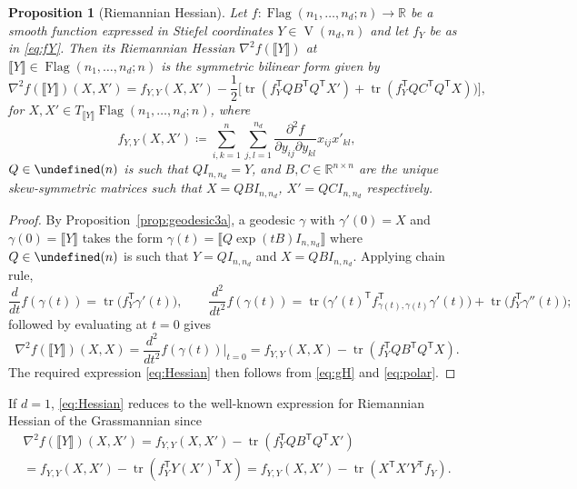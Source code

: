 \documentclass[11pt,reqno]{amsart}%
\newtheorem{proposition}[theorem]{Proposition}
\theoremstyle{definition}
\theoremstyle{remark}
\newcommand{\tp}{{\scriptscriptstyle\mathsf{T}}}
\newcommand{\lb}{\llbracket}
\newcommand{\rb}{\rrbracket}
\let\O\undefined
\DeclareMathOperator{\V}{V}
\DeclareMathOperator{\Flag}{Flag}
\DeclareMathOperator{\O}{O}
\DeclareMathOperator{\tr}{tr}
\begin{document}
\begin{proposition}[Riemannian Hessian]\label{prop:Hessian}
Let $f:\Flag(n_1,\dots,n_d;n) \to \mathbb{R}$ be a smooth function expressed in Stiefel coordinates $Y \in \V(n_d, n)$ and let $f_Y$ be  as in \eqref{eq:fY}. Then its Riemannian Hessian $\nabla^2f(\lb Y \rb)$ at $\lb Y \rb \in \Flag(n_1,\dots,n_d;n) $ is the symmetric bilinear form given by
\begin{equation}\label{eq:Hessian}
\nabla^2f(\lb Y \rb) (X,X') = f_{Y,Y} ( X, X') - \frac{1}{2} \bigl[ \tr(f_Y^\tp  Q B^\tp  Q^\tp  X') +  \tr(f_Y^\tp  Q C^\tp  Q^\tp  X)  \bigr) \bigr],
\end{equation}
for $X,X'\in T_{\lb Y \rb} \Flag(n_1,\dots,n_d;n)$, where
\begin{equation}\label{eq:fYY}
f_{Y,Y} (X,X') \coloneqq \sum_{i,k=1}^n \sum_{j,l=1}^{n_d} \frac{\partial^2 f}{\partial y_{ij} \partial y_{kl}} x_{ij} x'_{kl},
\end{equation}
$Q\in \O(n)$ is such that $Q I_{n,n_d} = Y$, and $B,C \in \mathbb{R}^{n \times n}$ are the unique skew-symmetric matrices such that $X = Q B I_{n,n_d}$, $X' = Q C I_{n,n_d}$ respectively.
\end{proposition}
\begin{proof}
By Proposition~\ref{prop:geodesic3a}, a geodesic $\gamma$ with $\gamma'(0) = X$ and $\gamma(0) = \lb Y \rb$ takes the form $\gamma(t) = \lb Q\exp(tB) I_{n,n_d} \rb$  where $Q \in \O(n)$ is such that $Y = QI_{n,n_d}$ and $X = Q B I_{n,n_d}$. Applying chain rule,
\[
\frac{d}{dt} f(\gamma(t)) = \tr\bigl( f_Y^\tp  \gamma'(t)\bigr),\qquad
\frac{d^2 }{dt^2} f(\gamma(t))  = \tr\bigl(\gamma'(t)^\tp   f^\tp _{\gamma(t),\gamma(t)} \gamma'(t)\bigr) + \tr\bigl(f_Y^\tp \gamma''(t)\bigr);
\]
followed by evaluating at $t = 0$ gives
\[
\nabla^2f(\lb Y \rb)(X,X) =  \frac{d^2 }{dt^2} f(\gamma(t)) \Big|_{t=0} = f_{Y,Y} (X, X)  - \tr (f_Y^\tp  Q B^\tp  Q ^\tp  X).
\]
The required expression \eqref{eq:Hessian} then follows from \eqref{eq:gH} and \eqref{eq:polar}.
\end{proof}
If $d = 1$, \eqref{eq:Hessian} reduces to the well-known expression for Riemannian Hessian of the Grassmannian \cite[Section~2.5.4]{EAS} since
\begin{multline*}
\nabla^2f(\lb Y \rb) (X,X') = f_{Y,Y} (X, X') - \tr (f_Y^\tp   Q B^\tp  Q^\tp X') \\
 = f_{Y,Y} (X, X') - \tr (f_Y^\tp Y (X')^\tp X)  = f_{Y,Y} (X, X') - \tr (X^\tp X' Y^\tp f_Y).
\end{multline*}
\end{document}
